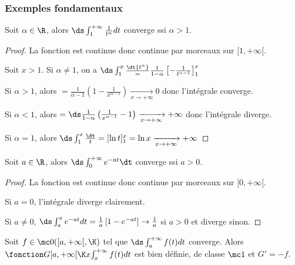 \subsubsection{Exemples fondamentaux }

\begin{proposition}{}{}
    Soit $\alpha \in \R$, alors $\ds \int_{1 }^{+ \infty   } \frac{1}{t^\alpha} dt$ converge
    ssi $\alpha > 1$. 
\end{proposition}

\begin{proof}
    La fonction est continue donc continue par morceaux sur $[1, + \infty[$.

    Soit $x > 1$. Si $\alpha \neq 1$, on a $\ds \int_{1 }^{x } \frac \dt {t^\alpha} = \frac{1}{1 - \alpha} \left[ - \frac{1}{t^{\alpha - 1}} \right]^x_1$


    \avspace Si $\alpha > 1$, alors $= \frac{1}{\alpha - 1} \left( 1 - \frac{1}{x^{\alpha - 1}} \right) \xrightarrow[x \to + \infty   ]{} 0$
    donc l'intégrale converge. 
    
    \avspace Si $\alpha < 1$, alors $= \ds \frac{1 }{ 1 - \alpha } \left( \frac{1}{x^{\alpha - 1}} - 1 \right) \xrightarrow[x \to + \infty   ]{} + \infty$
    donc l'intégrale diverge.

    \avspace Si $\alpha = 1$, alors $\ds \int_{1 }^{x } \frac \dt t = [\ln t]^x_1 = \ln x \xrightarrow[x \to + \infty   ]{} + \infty$
\end{proof}

\begin{proposition}{}{}
    Soit $a \in \R$, alors $\ds \int_{0 }^{ + \infty   } e^{-at} \dt$ converge ssi $a > 0$.
\end{proposition}

\begin{proof}
    La fonction est continue donc continue par morceaux sur $[0, + \infty[$.

    Si $a = 0$, l'intégrale diverge clairement.

    Si $a \neq 0$, $\ds \int_a^x e^{-at} dt = \frac 1 a \left[ 1 - e^{-at} \right] \to \frac 1 a$ si $a > 0$ et diverge sinon.
\end{proof}



\begin{definition}{}{}
    Soit $f \in \mc 0 ([a, + \infty[, \K)$ tel que $\ds \int_a^{+ \infty} f(t) dt$ converge.
    Alors $\fonction G {[a, + \infty[}{\K}{x}{\int_x^{+ \infty} f(t) dt}$ est bien définie, de 
    classe $\mc 1$ et $G' = -f$. 
\end{definition}

